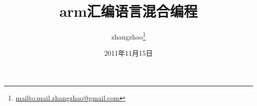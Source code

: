 \documentclass[11pt]{book}
\renewcommand{\chaptername}{第\CJKnumber{\thechapter}章}
\begin{document}
\begin{CJK}{UTF8}{hei}
\CJKindent %
\CJKtilde

\frontmatter

\title{\Huge arm汇编语言混合编程}
\author{zhangzhao\footnote{\href{mailto:mail.zhangzhao@gmail.com}{mailto:mail.zhangzhao@gmail.com}}}
\date{2011年11月15日}
\maketitle



\renewcommand{\chaptermark}[1]{\markboth{#1}{}}


\tableofcontents

\mainmatter
\renewcommand{\chaptermark}[1]{\markboth{\chaptername\ #1}{}}
\renewcommand{\sectionmark}[1]{\markright{\thesection\ #1}}








%


\newpage

\end{CJK}
\end{document}
